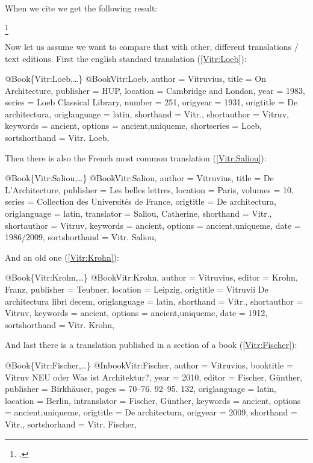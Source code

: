\documentclass[a4paper,
10pt,
greek,
french,
spanish,
italian,
ngerman,
english,
]{ltxdoc}
\begin{document}
When we cite \citeauthor{Vitr} we get the following result:
\begin{example}
\footnote{\cite[1,1,2]{Vitr}.}
\end{example}
Now let us assume we want to compare that with other, different translations / text editions. 
First the english standard translation (\cref{Vitr:Loeb}):
\begin{bibexample}[label=Vitr:Loeb]{{@}Book\{Vitr:Loeb,…\}}
@Book{Vitr:Loeb,
  author        = {Vitruvius},
  title         = {On Architecture},
  publisher     = HUP, %
  location      = {Cambridge and London},
  year          = {1983},
  series        = {Loeb Classical Library},
  number        = {251},
  origyear      = {1931},
  origtitle     = {De architectura},
  origlanguage  = {latin},
  shorthand     = {Vitr.},
  shortauthor   = {Vitruv},
  keywords      = {ancient},
  options       = {ancient,uniqueme},
  shortseries   = {Loeb},
  sortshorthand = {Vitr. Loeb},
}
\end{bibexample}
Then there is also the French most common translation (\cref{Vitr:Saliou}):
\begin{bibexample}[label=Vitr:Saliou]{{@}Book\{Vitr:Saliou,…\}}
@Book{Vitr:Saliou,
  author        = {Vitruvius},
  title         = {De L'Architecture},
  publisher     = {Les belles lettres},
  location      = Paris, %
  volumes        = {10},
  series        = {Collection des Universités de France},
  origtitle     = {De architectura},
  origlanguage  = {latin},
  translator    = {Saliou, Catherine},
  shorthand     = {Vitr.},
  shortauthor   = {Vitruv},
  keywords      = {ancient},
  options       = {ancient,uniqueme},
  date          = {1986/2009},
  sortshorthand = {Vitr. Saliou},
}
\end{bibexample}
And an old one (\cref{Vitr:Krohn}):
\begin{bibexample}[label=Vitr:Krohn]{{@}Book\{Vitr:Krohn,…\}}
@Book{Vitr:Krohn,
  author        = {Vitruvius},
  editor        = {Krohn, Franz},
  publisher     = {Teubner},
  location      = Leipzig, %
  origtitle     = {Vitruvii De architectura libri decem},
  origlanguage  = {latin},
  shorthand     = {Vitr.},
  shortauthor   = {Vitruv},
  keywords      = {ancient},
  options       = {ancient,uniqueme},
  date          = {1912},
  sortshorthand = {Vitr. Krohn},
}
\end{bibexample}

And last there is a translation published in a section of a book (\cref{Vitr:Fischer}):
\begin{bibexample}[label=Vitr:Fischer]{{@}Book\{Vitr:Fischer,…\}}
@Inbook{Vitr:Fischer,
  author       = {Vitruvius},
  booktitle    = {Vitruv NEU oder Was ist Architektur?},
  year         = {2010},
  editor       = {Fischer, Günther},
  publisher    = {Birkhäuser},
  pages        = {70--76. 92--95. 132\psq},
  origlanguage = {latin},
  location     = Berlin, %
  intranslator = {Fischer, Günther},
  keywords     = {ancient},
  options      = {ancient,uniqueme},
  origtitle    = {De architectura},
  origyear     = {2009},
  shorthand    = {Vitr.},
  sortshorhand = {Vitr. Fischer},
}
\end{bibexample}
\end{document}

